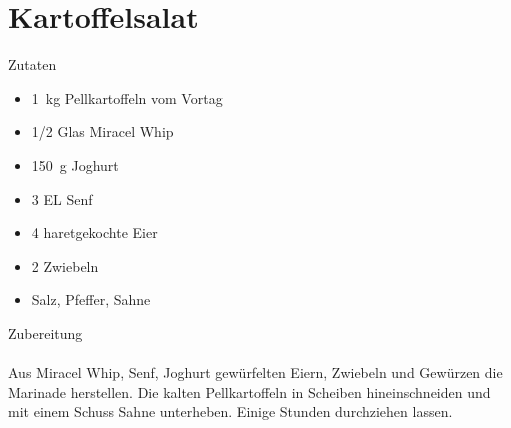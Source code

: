 \section*{Kartoffelsalat}
\ihead{}\ohead{}
\cfoot{}
{\Large Zutaten}
\begin{multicols}{2}
\begin{itemize}
    \item \SI{1}{kg} Pellkartoffeln vom Vortag
    \item \num{1/2} Glas Miracel Whip
    \item \SI{150}{g} Joghurt
    \item \num{3} EL Senf
    \item \num{4} haretgekochte Eier
    \item \num{2} Zwiebeln
    \item Salz, Pfeffer, Sahne
\end{itemize}
\end{multicols}
\noindent
{\Large Zubereitung}\\
\\
Aus Miracel Whip, Senf, Joghurt gewürfelten Eiern, Zwiebeln und Gewürzen die Marinade herstellen.
Die kalten Pellkartoffeln in Scheiben hineinschneiden und mit einem Schuss Sahne unterheben.
Einige Stunden durchziehen lassen.
